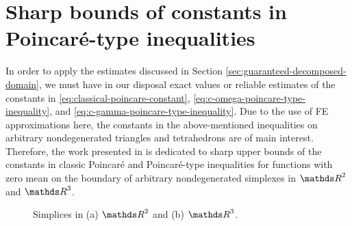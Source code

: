 \section{Sharp bounds of constants in Poincar\'{e}-type inequalities}
\label{sec:constants-poincare-inequalities}

In order to apply the estimates discussed in Section \ref{sec:guaranteed-decomposed-domain},
we must have  in our disposal exact values or reliable estimates of the constants in 
\eqref{eq:classical-poincare-constant}, \eqref{eq:c-omega-poincare-type-inequality}, 
and \eqref{eq:c-gamma-poincare-type-inequality}. Due to the use of FE
approximations here, the constants in the above-mentioned inequalities on arbitrary nondegenerated 
triangles and tetrahedrons are of main interest. Therefore, the work presented in 
\cite{RefArxivMatculevichRepin2015} is dedicated to sharp upper bounds of the constants 
in classic Poincar\'{e} and 
Poincar\'{e}-type inequalities for functions with zero mean on the boundary of arbitrary 
nondegenerated simplexes in $\Rtwo$ and $\Rthree$. 

\begin{figure}[h]
\centering
\subfloat[]{
\label{eq:2d-simplex}
}
\subfloat[]{

\label{eq:3d-simplex}}
\caption{Simplices in (a) $\Rtwo$ and (b) $\Rthree$.}
\end{figure}


